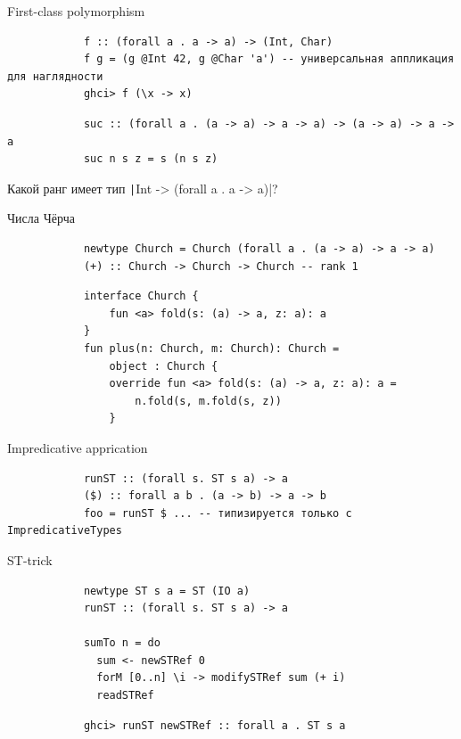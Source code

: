     \begin{frame}[fragile]{First-class polymorphism}
        \pause
        \begin{verbatim}
            f :: (forall a . a -> a) -> (Int, Char)
            f g = (g @Int 42, g @Char 'a') -- универсальная аппликация для наглядности
            ghci> f (\x -> x)
        \end{verbatim}

        \pause\hspace{2em}
        \begin{verbatim}
            suc :: (forall a . (a -> a) -> a -> a) -> (a -> a) -> a -> a
            suc n s z = s (n s z)
        \end{verbatim}
        \pause\hspace{2em}
        Какой ранг имеет тип \texttt|Int -> (forall a . a -> a)|?
    \end{frame}

    \begin{frame}[fragile]{Числа Чёрча}
        \pause
        \begin{verbatim}
            newtype Church = Church (forall a . (a -> a) -> a -> a)
            (+) :: Church -> Church -> Church -- rank 1
        \end{verbatim}

        \pause\hspace{2em}
        \begin{verbatim}
            interface Church {
                fun <a> fold(s: (a) -> a, z: a): a
            }
            fun plus(n: Church, m: Church): Church =
                object : Church {
                override fun <a> fold(s: (a) -> a, z: a): a =
                    n.fold(s, m.fold(s, z))
                }
        \end{verbatim}
    \end{frame}

    \begin{frame}[fragile]{Impredicative apprication}
        \pause
        \begin{verbatim}
            runST :: (forall s. ST s a) -> a
            ($) :: forall a b . (a -> b) -> a -> b
            foo = runST $ ... -- типизируется только с ImpredicativeTypes
        \end{verbatim}
    \end{frame}

    \begin{frame}[fragile]{ST-trick}
        \pause
        \begin{verbatim}
            newtype ST s a = ST (IO a)
            runST :: (forall s. ST s a) -> a

            sumTo n = do
              sum <- newSTRef 0
              forM [0..n] \i -> modifySTRef sum (+ i)
              readSTRef
        \end{verbatim}

        \pause\hspace{2em}
        \begin{verbatim}
            ghci> runST newSTRef :: forall a . ST s a
        \end{verbatim}
    \end{frame}

